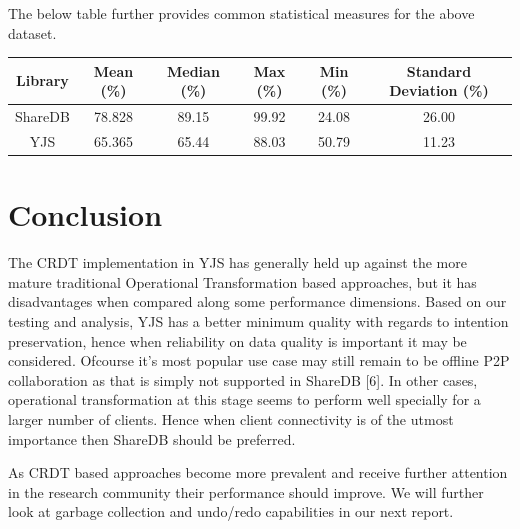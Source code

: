 \documentclass[9pt, titlepage]{article}
\begin{document}
  The below table further provides common statistical measures for the above dataset.\\

  \begin{center}
    \begin{tabular}{||c c c c c c||} 
      \hline
      Library & Mean (\%) & Median (\%) & Max (\%) & Min (\%) & Standard Deviation (\%) \\ [0.5ex] 
      \hline\hline
      ShareDB & 78.828 & 89.15 & 99.92 & 24.08 & 26.00 \\ 
      \hline
      YJS & 65.365 & 65.44 & 88.03 & 50.79 & 11.23 \\
      \hline
    \end{tabular}
  \end{center}
  \hfill \break
  \section{Conclusion}
  The CRDT implementation in YJS has generally held up against the more mature traditional Operational Transformation based approaches,
  but it has disadvantages when compared along some performance dimensions.
  Based on our testing and analysis, YJS has a better minimum quality with regards to intention preservation,
  hence when reliability on data quality is important it may be considered.
  Ofcourse it's most popular use case may still remain to be offline P2P collaboration as that is simply not supported in ShareDB [6].
  In other cases, operational transformation at this stage seems to perform well specially for a larger number of clients.
  Hence when client connectivity is of the utmost importance then ShareDB should be preferred.

  As CRDT based approaches become more prevalent and receive further attention in the research community their performance should improve.
  We will further look at garbage collection and undo/redo capabilities in our next report.

  \break
\end{document}
